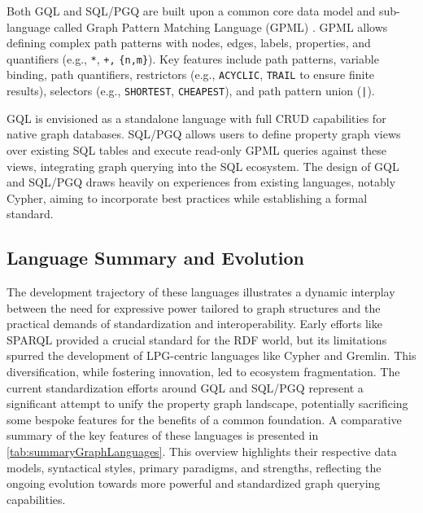 \documentclass[sigconf,natbib=false]{acmart}
\begin{document}
Both GQL and SQL/PGQ are built upon a common core data model and sub-language called Graph Pattern Matching Language (GPML) \cite{deutsch2022GraphPatternMatching}.
GPML allows defining complex path patterns with nodes, edges, labels, properties, and quantifiers (e.g., \texttt{*}, \texttt{+,} \texttt{\{n,m\}}).
Key features include path patterns, variable binding, path quantifiers, restrictors (e.g., \texttt{ACYCLIC}, \texttt{TRAIL} to ensure finite results), selectors (e.g., \texttt{SHORTEST}, \texttt{CHEAPEST}), and path pattern union (\texttt{|}).

GQL is envisioned as a standalone language with full CRUD capabilities for native graph databases.
SQL/PGQ allows users to define property graph views over existing SQL tables and execute read-only GPML queries against these views, integrating graph querying into the SQL ecosystem.
The design of GQL and SQL/PGQ draws heavily on experiences from existing languages, notably Cypher, aiming to incorporate best practices while establishing a formal standard.

\subsection*{Language Summary and Evolution}

The development trajectory of these languages illustrates a dynamic interplay between the need for expressive power tailored to graph structures and the practical demands of standardization and interoperability.
Early efforts like SPARQL provided a crucial standard for the RDF world, but its limitations spurred the development of LPG-centric languages like Cypher and Gremlin.
This diversification, while fostering innovation, led to ecosystem fragmentation.
The current standardization efforts around GQL and SQL/PGQ represent a significant attempt to unify the property graph landscape, potentially sacrificing some bespoke features for the benefits of a common foundation.
A comparative summary of the key features of these languages is presented in \cref{tab:summaryGraphLanguages}.
This overview highlights their respective data models, syntactical styles, primary paradigms, and strengths, reflecting the ongoing evolution towards more powerful and standardized graph querying capabilities.
\end{document}

